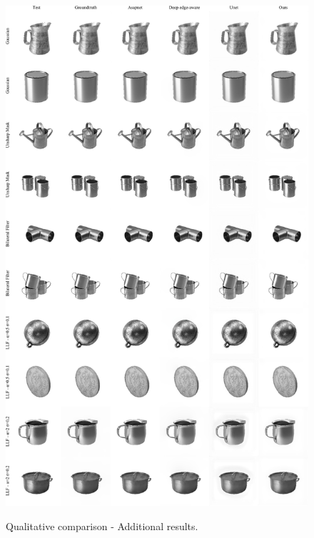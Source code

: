 \begin{figure}[ht]
  \centering
  {\includegraphics[width=0.9\linewidth]{Chapters/appendix-figs/material.pdf}}

   \caption{Qualitative comparison - Additional results.}
   \label{fig:appendix-tat1}
\end{figure}

